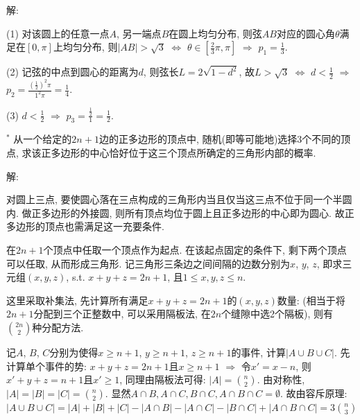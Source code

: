 \documentclass[standard]{ExBook}
\begin{document}
\begin{qitems}
    \begin{bbox}
解:

(1) 对该圆上的任意一点$A$, 另一端点$B$在圆上均匀分布, 则弦$AB$对应的圆心角$\theta$满足在$[0,\pi]$上均匀分布, 则$|AB| > \sqrt{3}$ $\Longleftrightarrow$ $\theta \in [\frac{2}{3}\pi,\pi]$ $\Longrightarrow$ $p_{1}=\frac{1}{3}$.

(2) 记弦的中点到圆心的距离为$d$, 则弦长$L=2\sqrt{1-d^2}$, 故$L > \sqrt{3}$ $\Longleftrightarrow$ $d < \frac{1}{2}$ $\Longrightarrow$ $p_{2}=\frac{(\frac{1}{2})^2\pi}{1^2\pi}=\frac{1}{4}$.

(3) $d < \frac{1}{2}$ $\Longrightarrow$ $p_{3}=\frac{\frac{1}{2}}{1}=\frac{1}{2}$.
    \end{bbox}

\vspace{-5em}

    \begin{bbox}
    \begin{shaded}
        \qitem$^*$
从一个给定的$2n + 1$边的正多边形的顶点中, 随机(即等可能地)选择3个不同的顶点, 求该正多边形的中心恰好位于这三个顶点所确定的三角形内部的概率.
    \end{shaded}
    \end{bbox}

\vspace{-5em}

    \begin{bbox}
解:

对圆上三点, 要使圆心落在三点构成的三角形内当且仅当这三点不位于同一个半圆内. 做正多边形的外接圆, 则所有顶点均位于圆上且正多边形的中心即为圆心. 故正多边形的顶点也需满足这一充要条件.

在$2n+1$个顶点中任取一个顶点作为起点. 在该起点固定的条件下, 剩下两个顶点可以任取, 从而形成三角形. 记三角形三条边之间间隔的边数分别为$x$, $y$, $z$, 即求三元组$(x,y,z)$, s.t. $x+y+z=2n+1$, 且$1\leq x,y,z\leq n$. 

这里采取补集法, 先计算所有满足$x+y+z=2n+1$的$(x,y,z)$数量: (相当于将$2n+1$分配到三个正整数中, 可以采用隔板法, 在$2n$个缝隙中选2个隔板), 则有$\binom{2n}{2}$种分配方法.

记$A$, $B$, $C$分别为使得$x \geq n+1$, $y \geq n+1$, $z \geq n+1$的事件, 计算$|A\cup B\cup C|$. 先计算单个事件的势: $x+y+z=2n+1$且$x \geq n+1$ $\Longrightarrow$ 令$x'=x-n$, 则$x'+y+z=n+1$且$x' \geq 1$, 同理由隔板法可得: $|A|=\binom{n}{2}$. 由对称性, $|A|=|B|=|C|=\binom{n}{2}$. 显然$A\cap B,A\cap C,B\cap C,A\cap B\cap C=\emptyset$. 故由容斥原理: $|A\cup B\cup C|=|A|+|B|+|C|-|A\cap B|-|A\cap C|-|B\cap C|+|A\cap B\cap C|=3\binom{n}{3}$


\end{bbox}
\end{qitems}
\end{document}
